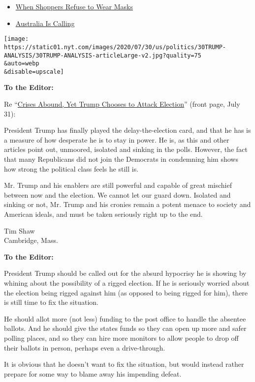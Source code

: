 \begin{itemize}
\tightlist
\item
  \protect\hyperlink{link-dcc4adc}{When Shoppers Refuse to Wear Masks}
\item
  \protect\hyperlink{link-597dc11b}{Australia Is Calling}
\end{itemize}

\texttt{[image: https://static01.nyt.com/images/2020/07/30/us/politics/30TRUMP-ANALYSIS/30TRUMP-ANALYSIS-articleLarge-v2.jpg?quality=75\\\&auto=webp\\\&disable=upscale]}

\textbf{To the Editor:}

Re
``\href{https://www.nytimes.com/2020/07/30/us/politics/trump-delay-election.html}{Crises
Abound, Yet Trump Chooses to Attack Election}'' (front page, July 31):

President Trump has finally played the delay-the-election card, and that
he has is a measure of how desperate he is to stay in power. He is, as
this and other articles point out, unmoored, isolated and sinking in the
polls. However, the fact that many Republicans did not join the
Democrats in condemning him shows how strong the political class feels
he still is.

Mr. Trump and his enablers are still powerful and capable of great
mischief between now and the election. We cannot let our guard down.
Isolated and sinking or not, Mr. Trump and his cronies remain a potent
menace to society and American ideals, and must be taken seriously right
up to the end.

Tim Shaw\\
Cambridge, Mass.

\textbf{To the Editor:}

President Trump should be called out for the absurd hypocrisy he is
showing by whining about the possibility of a rigged election. If he is
seriously worried about the election being rigged against him (as
opposed to being rigged for him), there is still time to fix the
situation.

He should allot more (not less) funding to the post office to handle the
absentee ballots. And he should give the states funds so they can open
up more and safer polling places, and so they can hire more monitors to
allow people to drop off their ballots in person, perhaps even a
drive-through.

It is obvious that he doesn't want to fix the situation, but would
instead rather prepare for some way to blame away his impending defeat.

